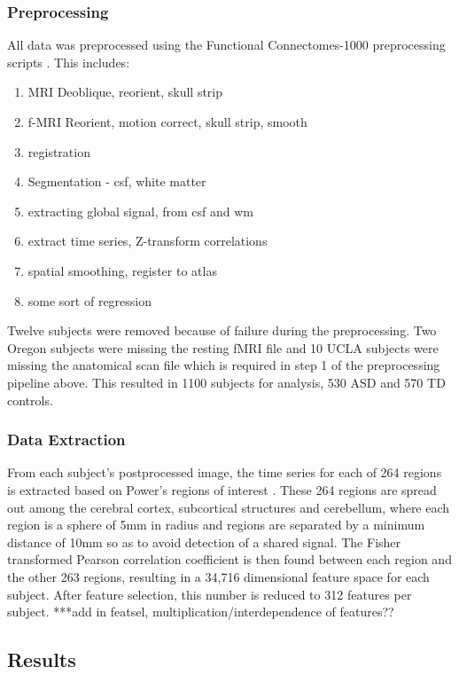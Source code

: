 \documentclass{llncs}
\begin{document}
\subsubsection{Preprocessing}
All data was preprocessed using the Functional Connectomes-1000 preprocessing scripts \cite{fcon}. This includes:
\begin{enumerate}
\item MRI Deoblique, reorient, skull strip
\item f-MRI Reorient, motion correct, skull strip, smooth
\item registration
\item Segmentation - csf, white matter
\item extracting global signal, from csf and wm
\item extract time series, Z-transform correlations
\item spatial smoothing, register to atlas
\item some sort of regression
\end{enumerate}
Twelve subjects were removed because of failure during the preprocessing.  Two Oregon subjects were missing the resting fMRI file and 10 UCLA subjects were missing the anatomical scan file which is required in step 1 of the preprocessing pipeline above. This resulted in 1100 subjects for analysis, 530 ASD and 570 TD controls.
\subsubsection{Data Extraction}
From each subject's postprocessed image, the time series for each of 264 regions is extracted based on Power's regions of interest \cite{Powers}. These 264 regions are spread out among the cerebral cortex, subcortical structures and cerebellum, where each region is a sphere of 5mm in radius and regions are separated by a minimum distance of 10mm so as to avoid detection of a shared signal. The Fisher transformed Pearson correlation coefficient is then found between each region and the other 263 regions, resulting in a 34,716 dimensional feature space for each subject. After feature selection, this number is reduced to 312 features per subject.
***add in featsel, multiplication/interdependence of features??
\subsection{Results}
\end{document}
